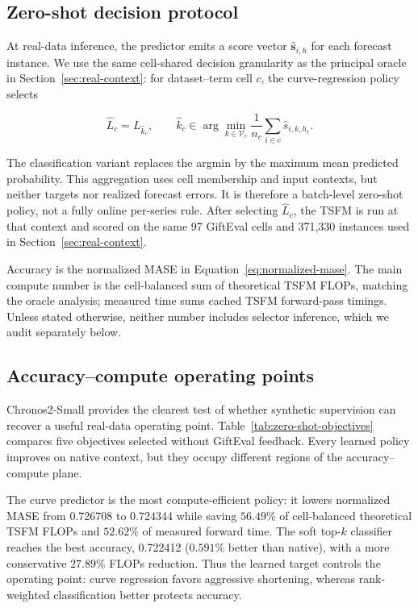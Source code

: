 \subsection{Zero-shot decision protocol}
\label{sec:zero-shot-decision}

At real-data inference, the predictor emits a score vector
$\widehat{\boldsymbol{s}}_{i,h}$ for each forecast instance.  We use the same
cell-shared decision granularity as the principal oracle in
Section~\ref{sec:real-context}: for dataset--term cell $c$, the curve-regression
policy selects

\begin{equation}
    \widehat L_c
       = L_{\widehat k_c},
    \qquad
    \widehat k_c
       \in \arg\min_{k\in\mathcal{V}_c}
          \frac{1}{n_c}\sum_{i\in c}\widehat s_{i,k,h_c}.
    \label{eq:zero-shot-cell-policy}
\end{equation}

The classification variant replaces the argmin by the maximum mean predicted
probability.
This aggregation uses cell membership and input contexts, but neither targets
nor realized forecast errors.  It is therefore a batch-level zero-shot policy,
not a fully online per-series rule.  After selecting $\widehat L_c$, the TSFM is
run at that context and scored on the same 97 GiftEval cells and 371,330
instances used in Section~\ref{sec:real-context}.

Accuracy is the normalized MASE in Equation~\ref{eq:normalized-mase}.  The main
compute number is the cell-balanced sum of theoretical TSFM FLOPs, matching the
oracle analysis; measured time sums cached TSFM forward-pass timings.  Unless
stated otherwise, neither number includes selector inference, which we audit
separately below.

\subsection{Accuracy--compute operating points}
\label{sec:zero-shot-chronos}

Chronos2-Small provides the clearest test of whether synthetic supervision can
recover a useful real-data operating point.  Table~\ref{tab:zero-shot-objectives}
compares five objectives selected without GiftEval feedback.  Every learned
policy improves on native context, but they occupy different regions of the
accuracy--compute plane.

The curve predictor is the most compute-efficient policy: it lowers normalized
MASE from 0.726708 to 0.724344 while saving $56.49\%$ of cell-balanced
theoretical TSFM FLOPs and $52.62\%$ of measured forward time.  The soft
top-$k$ classifier reaches the best accuracy, 0.722412 ($0.591\%$ better than
native), with a more conservative $27.89\%$ FLOPs reduction.  Thus the learned
target controls the operating point: curve regression favors aggressive
shortening, whereas rank-weighted classification better protects accuracy.

